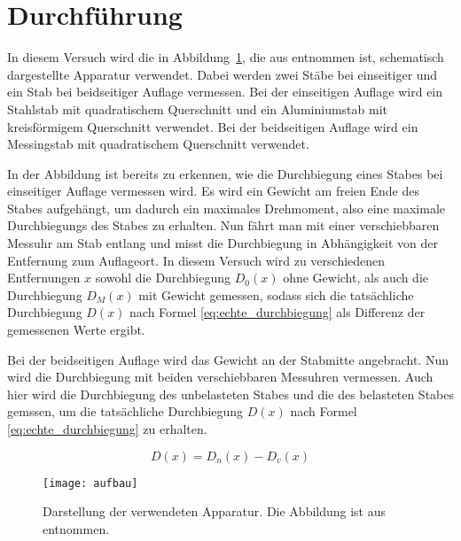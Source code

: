 \section{Durchführung}
In diesem Versuch wird die in Abbildung~\ref{fig:aufbau}, die aus
\textcite{v103} entnommen ist, schematisch dargestellte Apparatur
verwendet.  Dabei werden zwei Stäbe bei einseitiger und ein Stab bei
beidseitiger Auflage vermessen.  Bei der einseitigen Auflage wird ein
Stahlstab mit quadratischem Querschnitt und ein Aluminiumstab mit
kreisförmigem Querschnitt verwendet. Bei der beidseitigen Auflage wird
ein Messingstab mit quadratischem Querschnitt verwendet.

In der Abbildung ist bereits zu erkennen, wie die Durchbiegung eines
Stabes bei einseitiger Auflage vermessen wird. Es wird ein Gewicht am
freien Ende des Stabes aufgehängt, um dadurch ein maximales Drehmoment,
also eine maximale Durchbiegungs des Stabes zu erhalten. Nun fährt man
mit einer verschiebbaren Messuhr am Stab entlang und misst die
Durchbiegung in Abhängigkeit von der Entfernung zum Auflageort. In
diesem Versuch wird zu verschiedenen Entfernungen $x$ sowohl die
Durchbiegung $D_0(x)$ ohne Gewicht, als auch die Durchbiegung $D_M(x)$
mit Gewicht gemessen, sodass sich die tatsächliche Durchbiegung $D(x)$
nach Formel \eqref{eq:echte_durchbiegung} als Differenz der gemessenen
Werte ergibt.

Bei der beidseitigen Auflage wird das Gewicht an der Stabmitte
angebracht. Nun wird die Durchbiegung mit beiden verschiebbaren
Messuhren vermessen. Auch hier wird die Durchbiegung des unbelasteten
Stabes und die des belasteten Stabes gemssen, um die tatsächliche
Durchbiegung $D(x)$ nach Formel \eqref{eq:echte_durchbiegung} zu
erhalten.

\begin{equation}
\label{eq:echte_durchbiegung}
D(x) = D_n(x) - D_v(x)
\end{equation}

\begin{figure}
\centering
\texttt{[image: aufbau]}
\caption{Darstellung der verwendeten Apparatur. Die Abbildung ist aus
  \textcite{v103} entnommen.}
\label{fig:aufbau}
\end{figure} 
